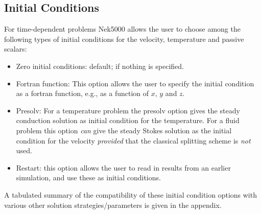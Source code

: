 \subsection{Initial Conditions}

For time-dependent problems Nek5000 allows the user to choose among
the following types of initial conditions for the
velocity, temperature and passive scalars:
\begin{itemize}
\item Zero initial conditions: default; if nothing is specified.
\item Fortran function: This option allows the user to specify the
  initial condition as a fortran function,
  e.g., as a function of \(x\), \(y\) and \(z\).
\item Presolv: For a temperature problem the presolv option gives the
  steady conduction solution as initial condition for the temperature.
  For a fluid problem this option {\em can} give the
  steady Stokes solution as the initial condition for the velocity
  {\em provided} that the classical splitting scheme is {\em not} used.
\item Restart: this option allows the user to read in results from an earlier
  simulation, and use these as initial conditions.
\end{itemize}
A tabulated summary of the compatibility of these initial condition options
with various other solution strategies/parameters is given in the appendix.
